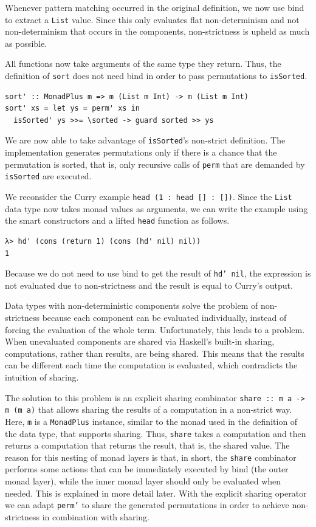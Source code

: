 \documentclass[a4paper, 11pt, fleqn, twoside]{scrreprt}
\newcommand{\hinl}[1]{\texttt{#1}}
\begin{document}
Whenever pattern matching occurred in the original definition, we now use bind to extract a \hinl{List} value.
Since this only evaluates flat non-determinism and not non-determinism that occurs in the components, non-strictness is upheld as much as possible.

All functions now take arguments of the same type they return.
Thus, the definition of \hinl{sort} does not need bind in order to pass permutations to \hinl{isSorted}.

\begin{verbatim}
sort' :: MonadPlus m => m (List m Int) -> m (List m Int)
sort' xs = let ys = perm' xs in
  isSorted' ys >>= \sorted -> guard sorted >> ys
\end{verbatim}

We are now able to take advantage of \hinl{isSorted}'s non-strict definition.
The implementation generates permutations only if there is a chance that the permutation is sorted, that is, only recursive calls of \hinl{perm} that are demanded by \hinl{isSorted} are executed.

We reconsider the Curry example \hinl{head (1 : head [] : [])}.
Since the \hinl{List} data type now takes monad values as arguments, we can write the example using the smart constructors and a lifted \hinl{head} function as follows.

\begin{verbatim}
λ> hd' (cons (return 1) (cons (hd' nil) nil))
1
\end{verbatim}

Because we do not need to use bind to get the result of \hinl{hd' nil}, the expression is not evaluated due to non-strictness and the result is equal to Curry's output.

Data types with non-deterministic components solve the problem of non-strictness because each component can be evaluated individually, instead of forcing the evaluation of the whole term.
Unfortunately, this leads to a problem.
\label{sec:sharingComputations}
When unevaluated components are shared via Haskell's built-in sharing, computations, rather than results, are being shared.
This means that the results can be different each time the computation is evaluated, which contradicts the intuition of sharing.

The solution to this problem is an explicit sharing combinator \hinl{share :: m a -> m (m a)} that allows sharing the results of a computation in a non-strict way.
Here, \hinl{m} is a \hinl{MonadPlus} instance, similar to the monad used in the definition of the data type, that supports sharing.
Thus, \hinl{share} takes a  computation and then returns a computation that returns the result, that is, the shared value.
The reason for this nesting of monad layers is that, in short, the \hinl{share} combinator performs some actions that can be immediately executed by bind (the outer monad layer), while the inner monad layer should only be evaluated when needed.
This is explained in more detail later.
With the explicit sharing operator we can adapt \hinl{perm'} to share the generated permutations in order to achieve non-strictness in combination with sharing.
\end{document}
